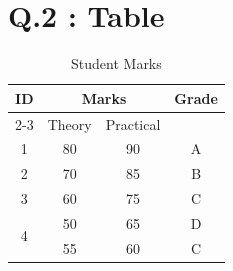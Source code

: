 \documentclass{article}
\begin{document}
\section{Q.2 : Table}

\begin{table}[h]
\centering
\begin{tabular}{|c|c|c|c|} 
\hline
\multirow{2}{*}{ID} & \multicolumn{2}{c|}{Marks} & Grade \\
\cline{2-3}
 & Theory & Practical &  \\
\hline
1 & 80 & 90 & A \\
2 & 70 & 85 & B \\
3 & 60 & 75 & C \\
\hline
\multirow{2}{*}{4} & 50 & 65 & D \\
 & 55 & 60 & C \\
\hline
\end{tabular}
\caption{Student Marks}
\end{table}
\end{document}
